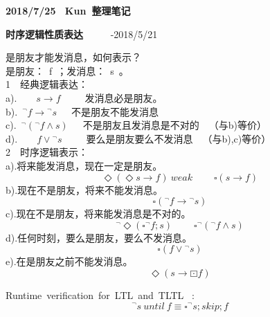 \newpage
\textbf{2018/7/25 ~Kun~整理笔记}
\begin{center}
\textbf{时序逻辑性质表达 }~~~~~-2018/5/21
\end{center}
是朋友才能发消息，如何表示？\\
是朋友：~f~；发消息：~s~。\\

\noindent\textcircled{\footnotesize{1}}~~经典逻辑表达：\\
a).~~~~$s\rightarrow f$~~~~~发消息必是朋友。\\
b).~${^\lnot} f\rightarrow {^\lnot}s$~~~不是朋友不能发消息\\
c).~${^\lnot} ( {^\lnot} f\wedge s )$~~~不是朋友且发消息是不对的~~（与b)等价）\\
d).~~~~$f\vee {^\lnot s}$~~~~~要么是朋友要么不发消息~~（与b),c)等价）\\



\noindent\textcircled{\footnotesize{2}}~~时序逻辑表示：\\
a).将来能发消息，现在一定是朋友。
$$\Diamond(\Diamond s \rightarrow f) ~weak~~~~~~~~~~\square(s\rightarrow f)$$
b).现在不是朋友，将来不能发消息。
$$\square({^\lnot} f \rightarrow{^\lnot} s)$$
c).现在不是朋友，将来能发消息是不对的。
$${^\lnot}\Diamond(\square{^\lnot}f;s)~~~~~~~~~~\square{^\lnot({^\lnot} f\wedge s)}$$
d).任何时刻，要么是朋友，要么不发消息。
$$\square(f\vee{^\lnot}s)$$
e).在是朋友之前不能发消息。
$$\Diamond(s\rightarrow\boxdot f)$$


\noindent Runtime~verification~for~LTL~and~TLTL ~:\\
$${^\lnot}s~until~f\equiv \square {^\lnot}s;skip;f$$




